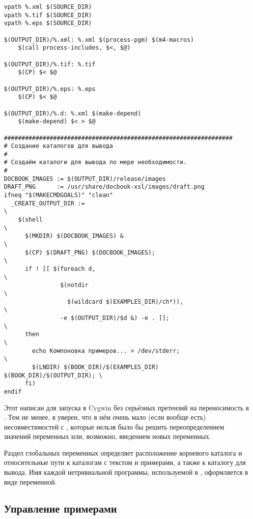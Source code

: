 {\begin{verbatim}
vpath %.xml $(SOURCE_DIR)
vpath %.tif $(SOURCE_DIR)
vpath %.eps $(SOURCE_DIR)

$(OUTPUT_DIR)/%.xml: %.xml $(process-pgm) $(m4-macros)
    $(call process-includes, $<, $@)

$(OUTPUT_DIR)/%.tif: %.tif
    $(CP) $< $@

$(OUTPUT_DIR)/%.eps: %.eps
    $(CP) $< $@

$(OUTPUT_DIR)/%.d: %.xml $(make-depend)
    $(make-depend) $< > $@

#################################################################
# Создание каталогов для вывода
#
# Создаём каталоги для вывода по мере необходимости.
#
DOCBOOK_IMAGES := $(OUTPUT_DIR)/release/images
DRAFT_PNG      := /usr/share/docbook-xsl/images/draft.png
ifneq "$(MAKECMDGOALS)" "clean"
  _CREATE_OUTPUT_DIR :=                                                 \
    $(shell                                                             \
      $(MKDIR) $(DOCBOOK_IMAGES) &                                      \
      $(CP) $(DRAFT_PNG) $(DOCBOOK_IMAGES);                             \
      if ! [[ $(foreach d,                                              \
                $(notdir                                                \
                  $(wildcard $(EXAMPLES_DIR)/ch*)),                     \
                -e $(OUTPUT_DIR)/$d &) -e . ]];                         \
      then                                                              \
        echo Компоновка примеров... > /dev/stderr;                      \
        $(LNDIR) $(BOOK_DIR)/$(EXAMPLES_DIR) $(BOOK_DIR)/$(OUTPUT_DIR); \
      fi)
endif
\end{verbatim}
}

Этот \Makefile{} написан для запуска в Cygwin без серьёзных претензий
на переносимость в \UNIX{}. Тем не менее, я уверен, что в нём очень
мало (если вообще есть) несовместимостей с \UNIX{}, которые нельзя
было бы решить переопределением значений переменных или, возможно,
введением новых переменных.

Раздел глобальных переменных определяет расположение корневого
каталога и относительные пути к каталогам с текстом и примерами, а
также к каталогу для вывода. Имя каждой нетривиальной программы,
используемой в , оформляется в виде переменной.

\subsection{Управление примерами}

